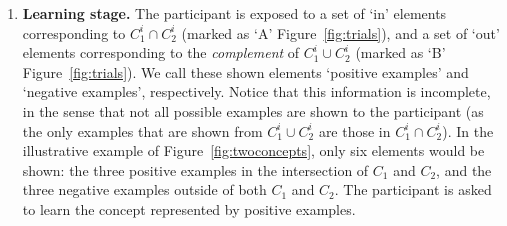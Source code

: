 \begin{enumerate}
    \item \label{item:LearningStage}{\bf Learning stage.} The participant is exposed to a set of `in' elements corresponding to $C^i_1\cap C^i_2$ (marked as `{\sf A}' Figure~\ref{fig:trials}), and a set of `out' elements corresponding to the {\em complement} of $C^i_1\cup C^i_2$ (marked as `{\sf B}' Figure~\ref{fig:trials}). %
    We call these shown elements `positive examples' and `negative examples', respectively. %
    Notice that this information is incomplete, in the sense that not all possible examples are shown to the participant (as the only examples that are shown from $C^i_1\cup C^i_2$ are those in $C^i_1\cap C^i_2$). In the illustrative example of Figure~\ref{fig:twoconcepts}, only six elements would be shown: the three positive examples in the intersection of $C_1$ and $C_2$, and the three negative examples outside of both $C_1$ and $C_2$. The participant is asked to learn the concept represented by positive examples.


\end{enumerate}
